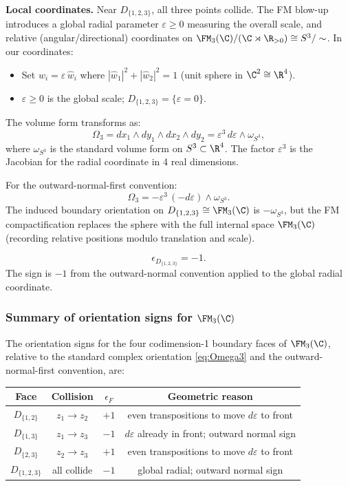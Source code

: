 \textbf{Local coordinates.} Near $D_{\{1,2,3\}}$, all three points collide. The FM blow-up introduces a global radial parameter $\varepsilon \ge 0$ measuring the overall scale, and relative (angular/directional) coordinates on $\FM_3(\C)/(\C\rtimes\R_{>0}) \cong S^3/\sim$. In our coordinates:
\begin{itemize}
\item Set $w_i = \varepsilon\,\hat{w}_i$ where $|\hat{w}_1|^2 + |\hat{w}_2|^2 = 1$ (unit sphere in $\C^2 \cong \R^4$).
\item $\varepsilon \ge 0$ is the global scale; $D_{\{1,2,3\}} = \{\varepsilon = 0\}$.
\end{itemize}
The volume form transforms as:
\[
\Omega_3 = dx_1\wedge dy_1\wedge dx_2\wedge dy_2 = \varepsilon^3\,d\varepsilon\wedge \omega_{S^3},
\]
where $\omega_{S^3}$ is the standard volume form on $S^3 \subset \R^4$. The factor $\varepsilon^3$ is the Jacobian for the radial coordinate in 4 real dimensions.

For the outward-normal-first convention:
\[
\Omega_3 = -\varepsilon^3\,(-d\varepsilon)\wedge\omega_{S^3}.
\]
The induced boundary orientation on $D_{\{1,2,3\}} \cong \FM_3(\C)$ is $-\omega_{S^3}$, but the FM compactification replaces the sphere with the full internal space $\FM_3(\C)$ (recording relative positions modulo translation and scale).

\begin{equation}
\label{eq:eps-D123}
\boxed{\epsilon_{D_{\{1,2,3\}}} = -1.}
\end{equation}
The sign is $-1$ from the outward-normal convention applied to the global radial coordinate.

\subsubsection{Summary of orientation signs for $\FM_3(\C)$}

\begin{proposition}[Orientation signs for $k=3$; \ClaimStatusProvedHere]
\label{prop:orient-signs-k3}
The orientation signs for the four codimension-1 boundary faces of $\FM_3(\C)$, relative to the standard complex orientation \eqref{eq:Omega3} and the outward-normal-first convention, are:
\begin{center}
\renewcommand{\arraystretch}{1.3}
\begin{tabular}{c|c|c|c}
\textbf{Face} & \textbf{Collision} & $\epsilon_F$ & \textbf{Geometric reason} \\
\hline
$D_{\{1,2\}}$ & $z_1\to z_2$ & $+1$ & even transpositions to move $d\varepsilon$ to front \\
$D_{\{1,3\}}$ & $z_1\to z_3$ & $-1$ & $d\varepsilon$ already in front; outward normal sign \\
$D_{\{2,3\}}$ & $z_2\to z_3$ & $+1$ & even transpositions to move $d\varepsilon$ to front \\
$D_{\{1,2,3\}}$ & all collide & $-1$ & global radial; outward normal sign
\end{tabular}
\end{center}
\end{proposition}


